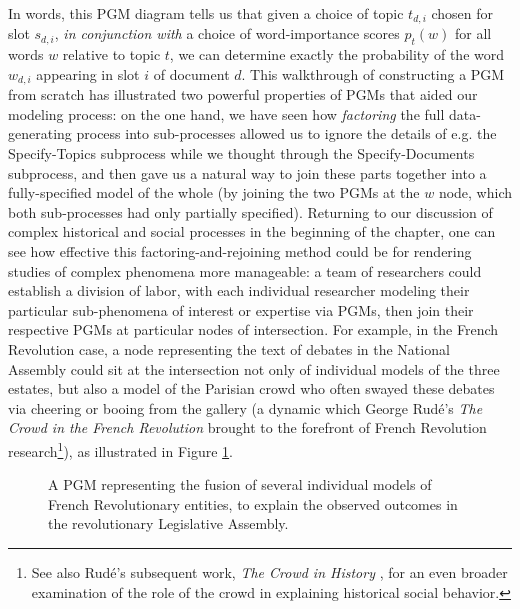\documentclass[11pt]{article}
\begin{document}
In words, this PGM diagram tells us that given a choice of topic $t_{d,i}$ chosen for slot $s_{d,i}$, \textit{in conjunction with} a choice of word-importance scores $p_t(w)$ for all words $w$ relative to topic $t$, we can determine exactly the probability of the word $w_{d,i}$ appearing in slot $i$ of document $d$. This walkthrough of constructing a PGM from scratch has illustrated two powerful properties of PGMs that aided our modeling process: on the one hand, we have seen how \textit{factoring} the full data-generating process into sub-processes allowed us to ignore the details of e.g. the \textsf{Specify-Topics} subprocess while we thought through the \textsf{Specify-Documents} subprocess, and then gave us a natural way to join these parts together into a fully-specified model of the whole (by joining the two PGMs at the $w$ node, which both sub-processes had only partially specified). Returning to our discussion of complex historical and social processes in the beginning of the chapter, one can see how effective this factoring-and-rejoining method could be for rendering studies of complex phenomena more manageable: a team of researchers could establish a division of labor, with each individual researcher modeling their particular sub-phenomena of interest or expertise via PGMs, then join their respective PGMs at particular nodes of intersection. For example, in the French Revolution case, a node representing the text of debates in the National Assembly could sit at the intersection not only of individual models of the three estates, but also a model of the Parisian crowd who often swayed these debates via cheering or booing from the gallery (a dynamic which George Rudé's \textit{The Crowd in the French Revolution} \citep{rude_crowd_1959} brought to the forefront of French Revolution research\footnote{See also Rudé's subsequent work, \textit{The Crowd in History} \citep{rude_crowd_1964}, for an even broader examination of the role of the crowd in explaining historical social behavior.}), as illustrated in Figure \ref{fig:pgm-crowd}.

\begin{figure}[ht!]
	\centering
	\caption{A PGM representing the fusion of several individual models of French Revolutionary entities, to explain the observed outcomes in the revolutionary Legislative Assembly.}
	\label{fig:pgm-crowd}
\end{figure}
\end{document}
